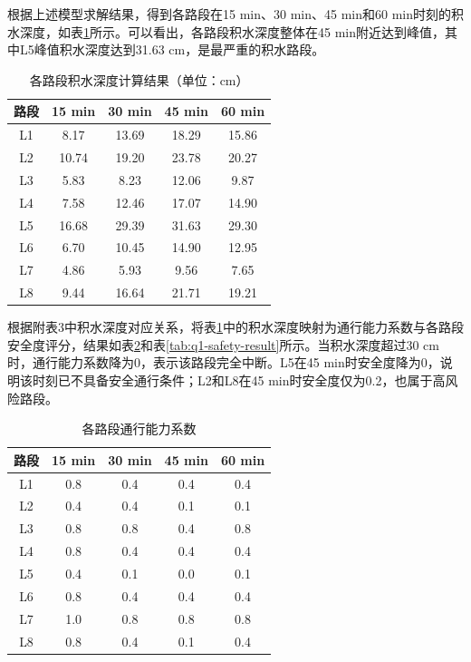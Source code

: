 \documentclass[UTF8,a4paper,12pt]{ctexart}
\begin{document}
根据上述模型求解结果，得到各路段在15 min、30 min、45 min和60 min时刻的积水深度，如表\ref{tab:q1-depth-result}所示。可以看出，各路段积水深度整体在45 min附近达到峰值，其中L5峰值积水深度达到31.63 cm，是最严重的积水路段。

\begin{table}[H]
\centering
\caption{各路段积水深度计算结果（单位：cm）}
\label{tab:q1-depth-result}
\begin{tabular}{ccccc}
\toprule
路段 & 15 min & 30 min & 45 min & 60 min \\
\midrule
L1 & 8.17 & 13.69 & 18.29 & 15.86 \\
L2 & 10.74 & 19.20 & 23.78 & 20.27 \\
L3 & 5.83 & 8.23 & 12.06 & 9.87 \\
L4 & 7.58 & 12.46 & 17.07 & 14.90 \\
L5 & 16.68 & 29.39 & 31.63 & 29.30 \\
L6 & 6.70 & 10.45 & 14.90 & 12.95 \\
L7 & 4.86 & 5.93 & 9.56 & 7.65 \\
L8 & 9.44 & 16.64 & 21.71 & 19.21 \\
\bottomrule
\end{tabular}
\end{table}

根据附表3中积水深度对应关系，将表\ref{tab:q1-depth-result}中的积水深度映射为通行能力系数与各路段安全度评分，结果如表\ref{tab:q1-capacity-result}和表\ref{tab:q1-safety-result}所示。当积水深度超过30 cm时，通行能力系数降为0，表示该路段完全中断。L5在45 min时安全度降为0，说明该时刻已不具备安全通行条件；L2和L8在45 min时安全度仅为0.2，也属于高风险路段。

\begin{table}[H]
\centering
\caption{各路段通行能力系数}
\label{tab:q1-capacity-result}
\begin{tabular}{ccccc}
\toprule
路段 & 15 min & 30 min & 45 min & 60 min \\
\midrule
L1 & 0.8 & 0.4 & 0.4 & 0.4 \\
L2 & 0.4 & 0.4 & 0.1 & 0.1 \\
L3 & 0.8 & 0.8 & 0.4 & 0.8 \\
L4 & 0.8 & 0.4 & 0.4 & 0.4 \\
L5 & 0.4 & 0.1 & 0.0 & 0.1 \\
L6 & 0.8 & 0.4 & 0.4 & 0.4 \\
L7 & 1.0 & 0.8 & 0.8 & 0.8 \\
L8 & 0.8 & 0.4 & 0.1 & 0.4 \\
\bottomrule
\end{tabular}
\end{table}
\end{document}
